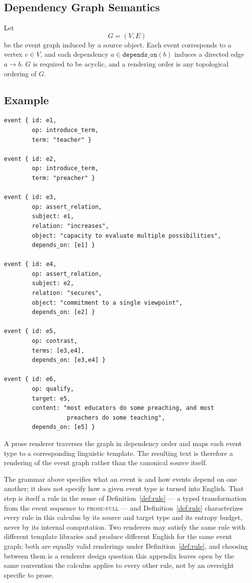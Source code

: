 \documentclass[11pt]{article}
\theoremstyle{definition}
\begin{document}
\subsection{Dependency Graph Semantics}

Let
\[
G = (V,E)
\]
be the event graph induced by a source object. Each event corresponds to a vertex $v \in V$, and each dependency $a \in \texttt{depends\_on}(b)$ induces a directed edge $a \rightarrow b$. $G$ is required to be acyclic, and a rendering order is any topological ordering of $G$.

\subsection{Example}

\begin{verbatim}
event { id: e1,
        op: introduce_term,
        term: "teacher" }

event { id: e2,
        op: introduce_term,
        term: "preacher" }

event { id: e3,
        op: assert_relation,
        subject: e1,
        relation: "increases",
        object: "capacity to evaluate multiple possibilities",
        depends_on: [e1] }

event { id: e4,
        op: assert_relation,
        subject: e2,
        relation: "secures",
        object: "commitment to a single viewpoint",
        depends_on: [e2] }

event { id: e5,
        op: contrast,
        terms: [e3,e4],
        depends_on: [e3,e4] }

event { id: e6,
        op: qualify,
        target: e5,
        content: "most educators do some preaching, and most
                  preachers do some teaching",
        depends_on: [e5] }
\end{verbatim}

A prose renderer traverses the graph in dependency order and maps each event type to a corresponding linguistic template. The resulting text is therefore a rendering of the event graph rather than the canonical source itself.

The grammar above specifies what an event is and how events depend on one another; it does not specify how a given event type is turned into English. That step is itself a rule in the sense of Definition~\ref{def:rule} --- a typed transformation from the event sequence to \textsc{prose-full} --- and Definition~\ref{def:rule} characterizes every rule in this calculus by its source and target type and its entropy budget, never by its internal computation. Two renderers may satisfy the same rule with different template libraries and produce different English for the same event graph; both are equally valid renderings under Definition~\ref{def:rule}, and choosing between them is a renderer design question this appendix leaves open by the same convention the calculus applies to every other rule, not by an oversight specific to prose.
\end{document}
